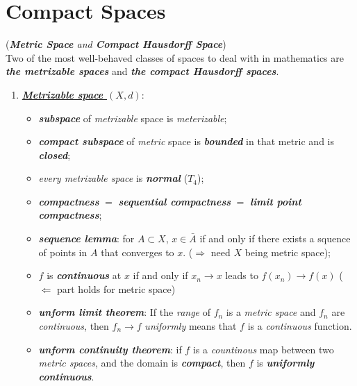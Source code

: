 \documentclass[11pt]{article}
\begin{document}
\section{Compact Spaces}
\begin{remark} (\emph{\textbf{Metric Space} and \textbf{Compact Hausdorff Space}})\\
Two of the most well-behaved classes of spaces to deal with in mathematics are \emph{\textbf{the metrizable spaces}} and \emph{\textbf{the compact Hausdorff spaces}}. 
\begin{enumerate}
\item \underline{\emph{\textbf{Metrizable space $(X ,d)$}}}: 
\begin{itemize}
\item \emph{\textbf{subspace}} of \emph{metrizable} space is \emph{meterizable};
\item \emph{\textbf{compact subspace}} of \emph{metric} space is \emph{\textbf{bounded}} in that metric and is \emph{\textbf{closed}};
\item \emph{every metrizable space} is \emph{\textbf{normal}} ($T_4$);
\item \emph{\textbf{compactness}} $=$ \emph{\textbf{sequential compactness}} $=$ \emph{\textbf{limit point compactness}};
\item \emph{\textbf{sequence lemma}}: for $A \subset X$,  $x \in \bar{A}$ if and only if  there exists a squence of points in $A$ that converges to $x$.  ($\Rightarrow$ need $X$ being metric space);
\item $f$ is \emph{\textbf{continuous}} at $x$ if and only if $x_n \rightarrow x$ leads to $f(x_n) \rightarrow f(x)$ ($\Leftarrow$ part holds for metric space)
\item \emph{\textbf{unform limit theorem}}: If the \emph{range} of $f_n$ is a \emph{metric space} and $f_n$ are \emph{continuous}, then $f_n \rightarrow f$ \emph{uniformly} means that $f$ is a \emph{continuous} function. 
\item \emph{\textbf{unform continuity theorem}}: if $f$ is a \emph{countinous} map between two \emph{metric spaces}, and the domain is \emph{\textbf{compact}}, then $f$ is \emph{\textbf{uniformly continuous}}.
\end{itemize}


\end{enumerate}
\end{remark}
\end{document}
